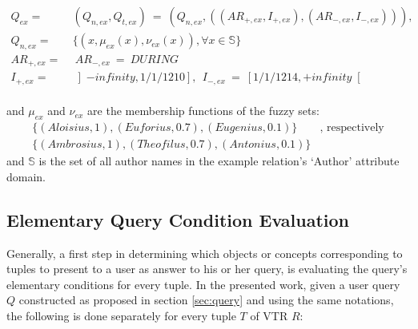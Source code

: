 \documentclass[runningheads,a4paper]{llncs}
\begin{document}
\vspace{-15pt}
\begin{align}
Q_{ex} = &\ (Q_{n,ex}, Q_{t,ex})\ =\ (Q_{n,ex}, ((AR_{+,ex}, I_{+,ex}), (AR_{-,ex}, I_{-,ex}))), \nonumber\\
Q_{n,ex} = &\ \{(x, \mu_{ex}(x), \nu_{ex}(x)), \forall x \in \mathbb{S} \}\nonumber \\
AR_{+,ex} = &\ \ AR_{-,ex}\ =\ DURING \nonumber \\
I_{+,ex} = &\ \left]- infinity, 1/1/1210\right],\ \ I_{-,ex}\ =\ \left[1/1/1214, + infinity\right[ \nonumber
\end{align}
\vspace{-10pt}\\
and $\mu_{ex}$ and $\nu_{ex}$ are the membership functions of the fuzzy sets:
\begin{align}
\{(Aloisius, 1), (Euforius, 0.7), (Eugenius, 0.1)\} &\text{, respectively} \nonumber \\
\{(Ambrosius, 1), (Theofilus, 0.7), (Antonius, 0.1)\} & \nonumber
\end{align}
and $\mathbb{S}$ is the set of all author names in the example relation's `Author' attribute domain.

\subsection{Elementary Query Condition Evaluation}
Generally, a first step in determining which objects or concepts corresponding to tuples to present to a user as answer to his or her query, is evaluating the query's elementary conditions for every tuple. In the presented work, given a user query $Q$ constructed as proposed in section \ref{sec:query} and using the same notations, the following is done separately for every tuple $T$ of VTR $R$:
\end{document}
